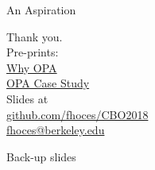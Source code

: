 \documentclass{beamer}
\def\blue{\color{blue}}
\begin{document}
\begin{frame}{An Aspiration}
\end{frame}



\begin{frame}[noframenumbering]
\begin{center}
\vspace*{6em}
{\LARGE Thank you.\\}
\bigskip
{\small
Pre-prints:\\
{\blue \href{https://osf.io/preprints/bitss/jnyqh}{Why OPA} } \\
{\blue \href{https://osf.io/preprints/bitss/ba7tr/}{OPA Case Study}  } \\
\medskip
Slides at \\
{\blue \href{http://www.github.com/fhoces/CBO2018}{github.com/fhoces/CBO2018}  }
\bigskip \\
\href{mailto:fhoces@berkeley.edu}{fhoces@berkeley.edu}
}
\end{center}
\end{frame}

\appendix

\begin{frame}[noframenumbering]
\begin{center}
Back-up slides
\end{center}
\end{frame}
\end{document}
